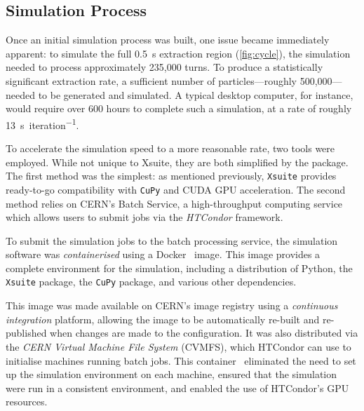 \documentclass[11pt]{report}
\begin{document}
\subsection{Simulation Process}\label{sec:sim_process}

Once an initial simulation process was built, one issue became immediately apparent: to simulate the full \qty{0.5}{\second} extraction region (\autoref{fig:cycle}), the simulation needed to process approximately 235,000 turns. To produce a statistically significant extraction rate, a sufficient number of particles---roughly 500,000---needed to be generated and simulated. A typical desktop computer, for instance, would require over 600 hours to complete such a simulation, at a rate of roughly \qty{13}{\second\per iteration}.

To accelerate the simulation speed to a more reasonable rate, two tools were employed. While not unique to Xsuite, they are both simplified by the package. The first method was the simplest: as mentioned previously, \verb|Xsuite| provides ready-to-go compatibility with \verb|CuPy| and CUDA GPU acceleration. The second method relies on CERN's Batch Service, a high-throughput computing service which allows users to submit jobs via the \textit{HTCondor} framework. 

To submit the simulation jobs to the batch processing service, the simulation software was \textit{containerised} using a Docker~\cite{merkel2014docker} image. This image provides a complete environment for the simulation, including a distribution of Python, the \verb|Xsuite| package, the \verb|CuPy| package, and various other dependencies. 

This image was made available on CERN's image registry using a \textit{continuous integration} platform, allowing the image to be automatically re-built and re-published when changes are made to the configuration. It was also distributed via the \textit{CERN Virtual Machine File System} (CVMFS), which HTCondor can use to initialise machines running batch jobs. This container~\cite{docker} eliminated the need to set up the simulation environment on each machine, ensured that the simulation were run in a consistent environment, and enabled the use of HTCondor's GPU resources. 
\end{document}
